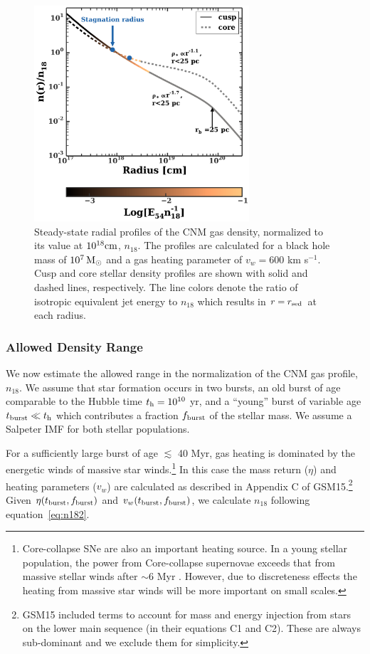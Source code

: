\documentclass[usenatbib,fleqn]{mnras}
\newcommand{\Msun}{{\rm M_\odot}}
\begin{document}
\begin{figure}
\includegraphics[width=8cm]{sedov_radius.pdf}
\caption{\label{fig:profiles} Steady-state radial profiles of the CNM
  gas density, normalized to its value at $10^{18} {\rm cm}$,
  $n_{18}$. The profiles are calculated for a black hole mass of
  $10^{7} \,\Msun$ and a gas heating parameter of $v_w=600$ km
  s$^{-1}$.  Cusp and core stellar density profiles are shown with
  solid and dashed lines, respectively.  The line colors denote the
  ratio of isotropic equivalent jet energy to $n_{18}$ which results
  in $r = r_{\rm sed}$ at each radius.}
\end{figure}

\subsubsection{Allowed Density Range}
\label{sec:densAllowed}
We now estimate the allowed range in the normalization of the CNM gas
profile, $n_{18}$.  We assume that star formation occurs in two
bursts, an old burst of age comparable to the Hubble time $t_{\rm h} =
10^{10}$ yr, and a ``young'' burst of variable age $t_{\rm burst} \ll
t_{\rm h}$ which contributes a fraction $f_{\rm burst}$ of the stellar
mass. We assume a Salpeter IMF for both stellar populations.

For a sufficiently large burst of age $\lesssim$ 40 Myr, gas heating
is dominated by the energetic winds of massive star
winds.\footnote{Core-collapse SNe are also an important heating
  source.  In a young stellar population, the power from Core-collapse
  supernovae exceeds that from massive stellar winds after $\sim$6 Myr
  \citep{Voss+2009}. However, due to discreteness effects the heating
  from massive star winds will be more important on small scales.}  In
this case the mass return ($\eta$) and heating parameters ($v_w$) are
calculated as described in Appendix C of GSM15.\footnote{GSM15
  included terms to account for mass and energy injection from stars
  on the lower main sequence (in their equations C1 and C2). These are
  always sub-dominant and we exclude them for simplicity.}  Given
$\eta(t_{\rm burst},f_{\rm burst})$ and $v_w(t_{\rm burst},f_{\rm
  burst})$, we calculate $n_{18}$ following equation~\eqref{eq:n182}.
\end{document}
